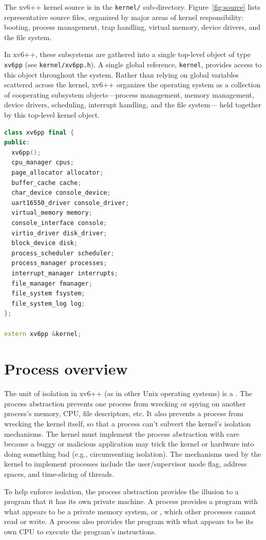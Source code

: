 The xv6++ kernel source is in the {\tt kernel/} sub-directory.
Figure~\ref{fig:source} lists representative source files,
organized by major areas of kernel responsibility: booting,
process management, trap handling, virtual memory,
device drivers, and the file system.

In xv6++, these subsystems are gathered into a single top-level
object of type \lstinline{xv6pp}
(see \texttt{kernel/xv6pp.h}).
A single global reference, \lstinline{kernel}, provides access to
this object throughout the system.
Rather than relying on global variables scattered across the kernel,
xv6++ organizes the operating system as a collection of cooperating
subsystem objects—process management, memory management,
device drivers, scheduling, interrupt handling, and the file system—
held together by this top-level kernel object.

\begin{lstlisting}[language=C++]
class xv6pp final {
public:
  xv6pp();
  cpu_manager cpus;
  page_allocator allocator;
  buffer_cache cache;
  char_device console_device;
  uart16550_driver console_driver;
  virtual_memory memory;
  console_interface console;
  virtio_driver disk_driver;
  block_device disk;
  process_scheduler scheduler;
  process_manager processes;
  interrupt_manager interrupts;
  file_manager fmanager;
  file_system fsystem;
  file_system_log log;
};

extern xv6pp &kernel;
\end{lstlisting}

\section{Process overview}

The unit of isolation in xv6++ (as in other Unix operating systems) is a
.
The process abstraction prevents one process from wrecking or spying on
another process's memory, CPU, file descriptors, etc.  It also prevents a process
from wrecking the kernel itself, so that a process can't subvert the kernel's
isolation mechanisms.
The kernel must implement the process abstraction with care because
a buggy or malicious application may trick the kernel or hardware into doing
something bad (e.g., circumventing isolation).  The mechanisms used by
the kernel to implement processes include the user/supervisor mode flag, address spaces,
and time-slicing of threads.

To help enforce isolation, the process abstraction provides the
illusion to a program that it has its own private machine.  A process provides
a program with what appears to be a private memory system, or
,
which other processes cannot read or write.
A process also provides the program with what appears to be its own
CPU to execute the program's instructions.

